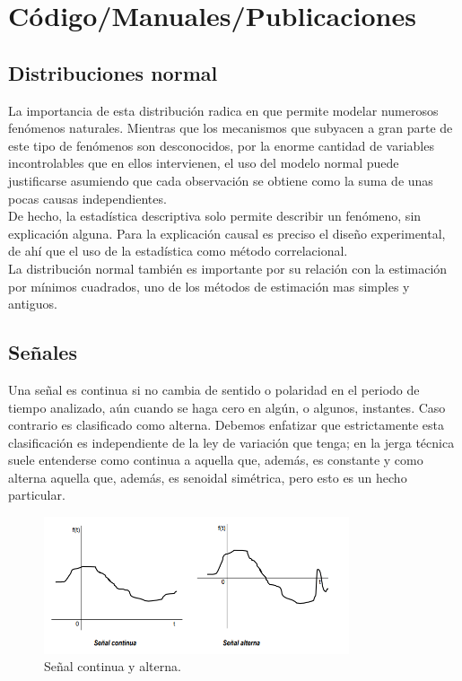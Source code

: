 \chapter{Código/Manuales/Publicaciones}
\section{Distribuciones normal}


La importancia de esta distribución radica en que permite modelar numerosos fenómenos naturales. Mientras que los mecanismos que subyacen a gran parte de este tipo de fenómenos son desconocidos, por la enorme cantidad de variables incontrolables  que en ellos intervienen, el uso del modelo normal puede justificarse asumiendo que cada observación se obtiene como la suma de unas pocas causas independientes.\\

De hecho, la estadística descriptiva solo permite describir un fenómeno, sin explicación alguna. Para la explicación causal es preciso el diseño experimental, de ahí que el uso de la estadística como método correlacional.\\

La distribución normal también es importante por su relación con la estimación por mínimos cuadrados, uno de los métodos de estimación mas simples y antiguos.



\section{Señales}
Una señal es continua si no cambia de sentido o polaridad en el periodo de tiempo analizado, aún cuando se haga cero en algún, o algunos, instantes. Caso contrario es clasificado como alterna. Debemos enfatizar que estrictamente esta clasificación es independiente de la ley de variación que tenga; en la jerga técnica suele entenderse como continua a aquella que, además, es constante y como alterna aquella que, además, es senoidal simétrica, pero esto es un hecho particular.

\begin{figure}[H]
\centering
\includegraphics[width=9cm]{continua.png}
\caption{Señal continua y alterna.}
\end{figure}

